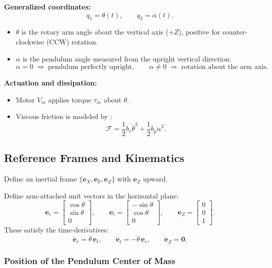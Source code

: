 \documentclass[12pt,a4paper]{article}
\begin{document}
\textbf{Generalized coordinates:}
\[
q_1=\theta(t), \qquad q_2=\alpha(t).
\]
\begin{itemize}
  \item $\theta$ is the rotary arm angle about the vertical axis ($+Z$), positive for counter-clockwise (CCW) rotation.
  \item $\alpha$ is the pendulum angle measured from the upright vertical direction:
  \[
  \alpha=0 \;\Rightarrow\; \text{pendulum perfectly upright}, \qquad \alpha\neq 0 \;\Rightarrow\; \text{rotation about the arm axis}.
  \]
\end{itemize}

\textbf{Actuation and dissipation:}
\begin{itemize}
  \item Motor $V_m$ applies torque $\tau_m$ about $\theta$.
  \item Viscous friction is modeled by :
  \[
  \mathcal{F}=\frac{1}{2}b_r\dot\theta^2+\frac{1}{2}b_p\dot\alpha^2.
  \]
\end{itemize}

\subsection{Reference Frames and Kinematics}

Define an inertial frame $\{\bm e_X,\bm e_Y,\bm e_Z\}$ with $\bm e_Z$ upward.

Define arm-attached unit vectors in the horizontal plane:
\[
\bm e_r =
\begin{bmatrix}\cos\theta\\ \sin\theta\\ 0\end{bmatrix},
\qquad
\bm e_t =
\begin{bmatrix}-\sin\theta\\ \cos\theta\\ 0\end{bmatrix},
\qquad
\bm e_Z=
\begin{bmatrix}0\\ 0\\ 1\end{bmatrix}.
\]
These satisfy the time-derivatives:
\[
\dot{\bm e}_r=\dot\theta\,\bm e_t,
\qquad
\dot{\bm e}_t=-\dot\theta\,\bm e_r,
\qquad
\dot{\bm e}_Z=\bm 0.
\]

\subsubsection{Position of the Pendulum Center of Mass}
\end{document}
